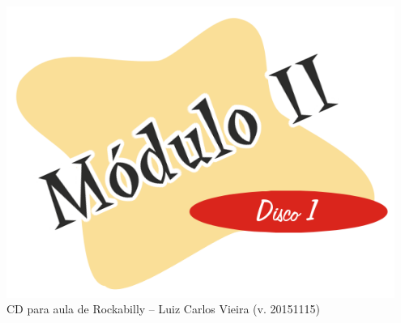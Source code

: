 \documentclass{article}
\begin{document}
\begin{minipage}[t][0.95\textheight][c]{0.5\textwidth}
    \centering
    \includegraphics[width=0.95\textwidth]{m2d1.png}\\
    {\tiny CD para aula de Rockabilly -- Luiz Carlos Vieira (v. 20151115)}
\end{minipage}

\newpage
\end{document}
